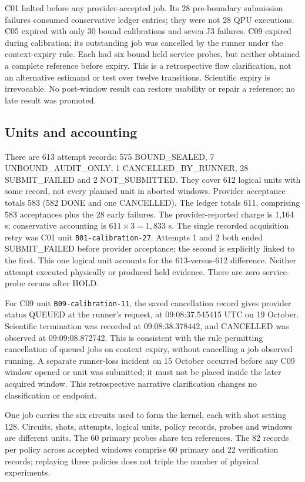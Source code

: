 \documentclass[11pt,a4paper]{article}
\begin{document}
C01 halted before any provider-accepted job. Its 28 pre-boundary submission failures consumed conservative ledger entries; they were not 28 QPU executions. C05 expired with only 30 bound calibrations and seven J3 failures. C09 expired during calibration; its outstanding job was cancelled by the runner under the context-expiry rule. Each had six bound held service probes, but neither obtained a complete reference before expiry. This is a retrospective flow clarification, not an alternative estimand or test over twelve transitions. Scientific expiry is irrevocable. No post-window result can restore usability or repair a reference; no late result was promoted.

\subsection{Units and accounting}
There are 613 attempt records: 575 BOUND\_SEALED, 7 UNBOUND\_AUDIT\_ONLY, 1 CANCELLED\_BY\_RUNNER, 28 SUBMIT\_FAILED and 2 NOT\_SUBMITTED. They cover 612 logical units with some record, not every planned unit in aborted windows. Provider acceptance totals 583 (582 DONE and one CANCELLED). The ledger totals 611, comprising 583 acceptances plus the 28 early failures. The provider-reported charge is 1,164 s; conservative accounting is $611\times3=1,833$ s. The single recorded acquisition retry was C01 unit \texttt{B01-calibration-27}. Attempts 1 and 2 both ended SUBMIT\_FAILED before provider acceptance; the second is explicitly linked to the first. This one logical unit accounts for the 613-versus-612 difference. Neither attempt executed physically or produced held evidence. There are zero service-probe reruns after HOLD.

For C09 unit \texttt{B09-calibration-11}, the saved cancellation record gives provider status QUEUED at the runner's request, at 09:08:37.545415 UTC on 19 October. Scientific termination was recorded at 09:08:38.378442, and CANCELLED was observed at 09:09:08.872742. This is consistent with the rule permitting cancellation of queued jobs on context expiry, without cancelling a job observed running. A separate runner-loss incident on 15 October occurred before any C09 window opened or unit was submitted; it must not be placed inside the later acquired window. This retrospective narrative clarification changes no classification or endpoint.

One job carries the six circuits used to form the kernel, each with shot setting 128. Circuits, shots, attempts, logical units, policy records, probes and windows are different units. The 60 primary probes share ten references. The 82 records per policy across accepted windows comprise 60 primary and 22 verification records; replaying three policies does not triple the number of physical experiments.
\end{document}
